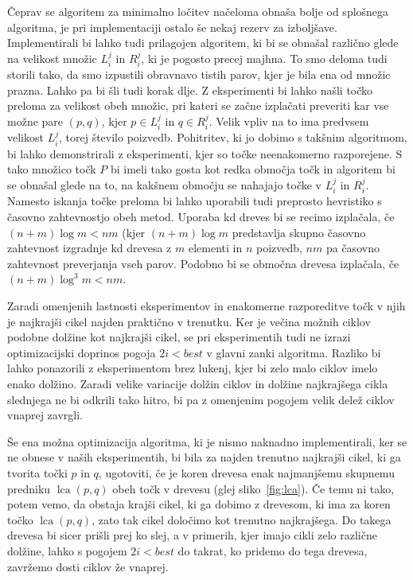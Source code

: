 \documentclass[a4paper, 12pt]{book}
\begin{document}
Čeprav se algoritem za minimalno ločitev načeloma obnaša bolje od splo\-šne\-ga algoritma, je pri implementaciji ostalo še nekaj rezerv za izboljšave. Implementirali bi lahko tudi prilagojen algoritem, ki bi se obnašal različno glede na velikost množic $L_i^j$ in $R_i^j$, ki je pogosto precej majhna. To smo deloma tudi storili tako, da smo izpustili obravnavo  tistih parov, kjer je bila ena od množic prazna. Lahko pa bi šli tudi korak dlje. Z eksperimenti bi lahko našli točko preloma za velikost obeh množic, pri kateri se začne izplačati preveriti kar vse možne pare $(p,q)$, kjer $p\in L_i^j$ in $q\in R_i^j$. Velik vpliv na to ima predvsem velikost $L_i^j$, torej število poizvedb. Pohitritev, ki jo dobimo s takšnim algoritmom, bi lahko demonstrirali z eksperimenti, kjer so točke neenakomerno razporejene. S tako množico točk $P$ bi imeli tako gosta kot redka območja točk in algoritem bi se obnašal glede na to, na kakšnem območju se nahajajo točke v $L_i^j$ in $R_i^j$. Namesto iskanja točke preloma bi lahko uporabili tudi preprosto hevristiko s časovno zahtevnostjo obeh metod. Uporaba kd dreves bi se recimo izplačala, če $(n+m)\log m < nm$ (kjer $(n+m)\log m$ predstavlja skupno časovno zahtevnost izgradnje kd drevesa z $m$ elementi in $n$ poizvedb, $nm$ pa časovno zahtevnost preverjanja vseh parov. Podobno bi se območna drevesa izplačala, če $(n+m)\log^3 m < nm$.

Zaradi omenjenih lastnosti eksperimentov in enakomerne razporeditve točk v njih je najkrajši cikel najden praktično v trenutku. Ker je večina možnih ciklov podobne dolžine kot najkrajši cikel, se pri eksperimentih tudi ne izrazi optimizacijski doprinos pogoja $2i < best$ v glavni zanki algoritma. Razliko bi lahko ponazorili z eksperimentom brez lukenj, kjer bi zelo malo ciklov imelo enako dolžino. Zaradi velike variacije dolžin ciklov in dolžine najkrajšega cikla slednjega ne bi odkrili tako hitro, bi pa z omenjenim pogojem velik delež ciklov vnaprej zavrgli.

Še ena možna optimizacija algoritma, ki je nismo naknadno implementirali, ker se ne obnese v naših eksperimentih, bi bila za najden trenutno najkrajši cikel, ki ga tvorita točki $p$ in $q$, ugotoviti, če je koren drevesa enak najmanjšemu skupnemu predniku $\operatorname{lca}(p,q)$ obeh točk v drevesu (glej sliko~\ref{fig:lca}). Če temu ni tako, potem vemo, da obstaja krajši cikel, ki ga dobimo z drevesom, ki ima za koren točko $\operatorname{lca}(p,q)$, zato tak cikel določimo kot trenutno najkrajšega. Do takega drevesa bi sicer prišli prej ko slej, a v primerih, kjer imajo cikli zelo različne dolžine, lahko s pogojem $2i < best$ do takrat, ko pridemo do tega drevesa, zavržemo dosti ciklov že vnaprej.
\end{document}
